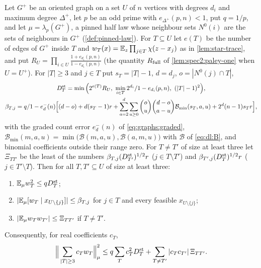 \begin{lemma}\label{lem:wt:stars}
Let $G^+$ be an oriented graph on a set $U$ of $n$ vertices with degrees $d_i$
and maximum degree $\Delta^+$, let $p$ be an odd prime with
$e_{\Delta^+}(p,n)<1$, put $q=1/p$, and let $\mu=\lambda_p(G^+)$, a pinned half
law whose neighbour sets $N^0(i)$ are the sets of neighbours in $G^+$
(\cref{def:pinned-law}). For $T\subseteq U$ let $e(T)$ be the number of edges of
$G^+$ inside $T$ and $w_T(x)=\E_z\prod_{j\in T}\chi(z-x_j)$ as in
\cref{lem:star-trace}, and put
$R_U=\prod_{i\in U}\frac{1+e_{d_i}(p,n)}{1-e_{d_i}(p,n)}$ (the quantity $R_{\rm full}$ of \cref{lem:spec2:paley-one} when $U=U^+$). For $|T|\ge3$ and
$j\in T$ put $s_T=|T|-1$, $d=d_j$, $o=|N^0(j)\cap T|$,
\begin{gather}
 D^{\rm st}_T=\min\Big(2^{e(T)}R_U,\ \min_{i\in T}\frac{2^{d_i}}{1-e_{d_i}(p,n)},
 \ (|T|-1)^2\Big),\label{eq:wt:Dst}\\
 \beta_{T,j}=\frac q{1-e^-_d(n)}\Big[(d-o)+d(s_T-1)r
 +\sum_{a=2}^d\sum_{u\ge0}\binom ou\binom{d-o}{a-u}\mathcal B_{\min}(s_T,a,u)
 +2^d(n-1)s_Tr\Big],\label{eq:wt:beta}
\end{gather}
with the graded count error $e^-_d(n)$ of \eqref{eq:graphs:graded},
$\mathcal B_{\min}(m,a,u)=\min\big(\mathcal B(m,a,u),\mathcal B(a,m,u)\big)$ with
$\mathcal B$ of \eqref{eq:dl:B}, and binomial coefficients outside their range
zero. For $T\ne T'$ of size at least three let $\Xi_{TT'}$ be the least of the
numbers $\beta_{T,j}(D^{\rm st}_{T'})^{1/2}r$ ($j\in T\setminus T'$) and
$\beta_{T',j}(D^{\rm st}_T)^{1/2}r$ ($j\in T'\setminus T$). Then for all
$T,T'\subseteq U$ of size at least three:
\begin{enumerate}[label=\textup{(\alph*)}]
\item $\E_\mu w_T^2\le qD^{\rm st}_T$;
\item $|\E_\mu[w_T\mid x_{U\setminus\{j\}}]|\le\beta_{T,j}$ for $j\in T$ and
  every feasible $x_{U\setminus\{j\}}$;
\item $|\E_\mu w_Tw_{T'}|\le\Xi_{TT'}$ if $T\ne T'$.
\end{enumerate}
Consequently, for real coefficients $c_T$,
\[
 \Big\|\sum_{|T|\ge3}c_Tw_T\Big\|^2_\mu\le q\sum_Tc_T^2D^{\rm st}_T
 +\sum_{T\ne T'}|c_Tc_{T'}|\,\Xi_{TT'} .
\]
\end{lemma}

